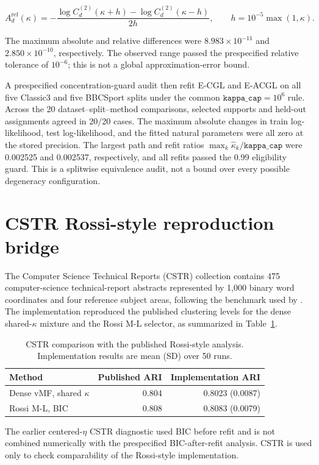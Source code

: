 \documentclass[preprint,12pt,authoryear]{elsarticle}
\begin{document}
\[
A_d^{\mathrm{ref}}(\kappa)
=-
\frac{\log C_d^{(2)}(\kappa+h)-\log C_d^{(2)}(\kappa-h)}{2h},
\qquad
h=10^{-5}\max(1,\kappa).
\]

The maximum absolute and relative differences were
$8.983\times10^{-11}$ and $2.850\times10^{-10}$, respectively. The observed
range passed the prespecified relative tolerance of $10^{-6}$; this is not a
global approximation-error bound.

A prespecified concentration-guard audit then refit E-CGL and E-ACGL on all five
Classic3 and five BBCSport splits under the common
$\texttt{kappa\_cap}=10^6$ rule. Across the 20 dataset--split--method
comparisons, selected supports and held-out assignments agreed in 20/20
cases. The maximum absolute changes in train log-likelihood, test
log-likelihood, and the fitted natural parameters were all zero at the stored
precision. The largest path and refit ratios
$\max_k\widehat\kappa_k/\texttt{kappa\_cap}$ were 0.002525 and 0.002537,
respectively, and all refits passed the 0.99 eligibility guard. This is a
splitwise equivalence audit, not a bound over every possible degeneracy
configuration.

\section{CSTR Rossi-style reproduction bridge}
\label{sec:s-cstr-bridge}

The Computer Science Technical Reports (CSTR) collection contains 475
computer-science technical-report abstracts represented by
1,000 binary word coordinates and four reference subject areas, following the
benchmark used by \citet{rossi2022sparsevmf}. The implementation reproduced
the published clustering levels for the dense shared-$\kappa$ mixture and the
Rossi M-L selector, as summarized in Table~\ref{tab:s-cstr-bridge}.

\begin{table}[H]
\centering
\small
\caption{CSTR comparison with the published Rossi-style analysis.
Implementation results are mean (SD) over 50 runs.}
\label{tab:s-cstr-bridge}
\begin{tabular}{lrr}
\toprule
Method & Published ARI & Implementation ARI \\
\midrule
Dense vMF, shared $\kappa$ & 0.804 & 0.8023 (0.0087) \\
Rossi M-L, BIC & 0.808 & 0.8083 (0.0079) \\
\bottomrule
\end{tabular}
\end{table}

The earlier centered-$\eta$ CSTR diagnostic used BIC before refit and is not
combined numerically with the prespecified BIC-after-refit analysis. CSTR is used only to
check comparability of the Rossi-style implementation.



\end{document}
